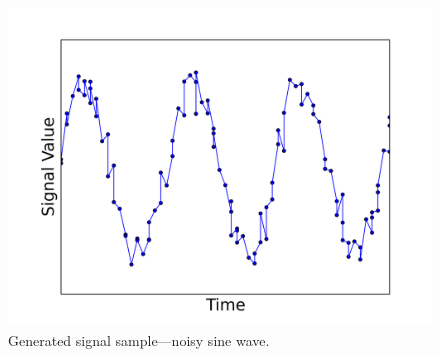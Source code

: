 \documentclass[11pt, letterpaper]{article}            %
\begin{document}
\begin{figure}[htbp]
  \centering
  \includegraphics[width=.7\textwidth]{./gfx/feature5.png}
  \caption{Generated signal sample---noisy sine wave.\label{fig:signal}}
\end{figure}
\end{document}
